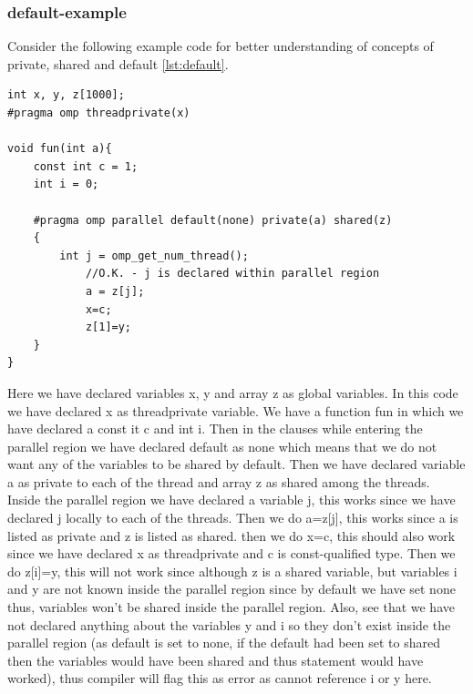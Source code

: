 \documentclass[12pt]{article}
\begin{document}
\subsubsection{default-example}
Consider the following example code for better understanding of concepts of private, shared and default \ref{lst:default}.
\begin{lstlisting}[caption={default-Example},captionpos=b,label={lst:default}]
int x, y, z[1000];
#pragma omp threadprivate(x)

void fun(int a){
    const int c = 1;
    int i = 0;

    #pragma omp parallel default(none) private(a) shared(z)
    {
        int j = omp_get_num_thread();
            //O.K. - j is declared within parallel region
            a = z[j];
            x=c;
            z[1]=y;
    }
}
\end{lstlisting}
Here we have declared variables x, y and array z as global variables. In this code we have declared x as threadprivate variable.  We have a function fun in which we have declared a const it c and int i. Then in the clauses while entering the parallel region we have declared default as none which means that we do not want any of the variables to be shared by default. Then we have declared variable a as private to each of the thread and array z as shared among the threads. Inside the parallel region we have declared a variable j, this works since we have declared j locally to each of the threads. Then we do a=z[j], this works since a is listed as private and z is listed as shared. then we do x=c, this should also work since we have declared x as threadprivate and c is const-qualified type. Then we do z[i]=y, this will not work since although z is a shared variable, but variables i and y are not known inside the parallel region since by default we have set none thus, variables won't be shared inside the parallel region. Also, see that we have not declared anything about the variables y and i so they don't exist inside the parallel region (as default is set to none, if the default had been set to shared then the variables would have been shared and thus statement would have worked), thus compiler will flag this as error as cannot reference i or y here.
\end{document}

